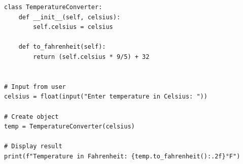 \begin{verbatim}
class TemperatureConverter:
    def __init__(self, celsius):
        self.celsius = celsius

    def to_fahrenheit(self):
        return (self.celsius * 9/5) + 32


# Input from user
celsius = float(input("Enter temperature in Celsius: "))

# Create object
temp = TemperatureConverter(celsius)

# Display result
print(f"Temperature in Fahrenheit: {temp.to_fahrenheit():.2f}°F")
\end{verbatim}
